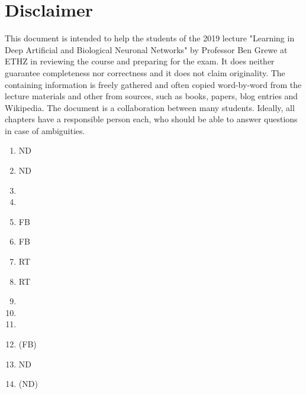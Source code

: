 \documentclass[main]{subfiles}
\begin{document}
\newpage
\section{Disclaimer}
This document is intended to help the students of the 2019 lecture "Learning in Deep Artificial and Biological Neuronal Networks" by Professor Ben Grewe at ETHZ in reviewing the course and preparing for the exam. It does neither guarantee completeness nor correctness and it does not claim originality. The containing information is freely gathered and often copied word-by-word from the lecture materials and other from sources, such as books, papers, blog entries and Wikipedia. The document is a collaboration between many students. Ideally, all chapters have a responsible person each, who should be able to answer questions in case of ambiguities. 
\begin{enumerate}
    \item ND
    \item ND
    \item
    \item
    \item FB
    \item FB
    \item RT
    \item RT
    \item
    \item
    \item
    \item (FB)
    \item ND
    \item (ND)
    
\end{enumerate}
\end{document}
